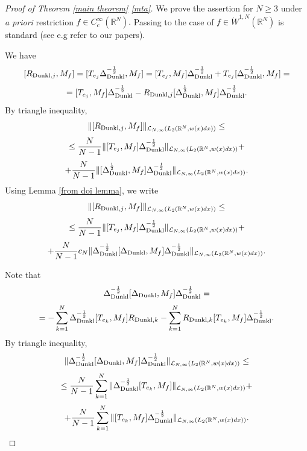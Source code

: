 \documentclass{amsart}
\begin{document}
\begin{proof}[Proof of Theorem \ref{main theorem} \eqref{mta}]
We prove the assertion for $N\geq3$ under {\it a priori} restriction $f\in C^{\infty}_c(\mathbb{R}^N).$ Passing to the case of $f\in\dot{W}^{1,N}(\mathbb{R}^N)$ is standard (see e.g {\color{red} refer to our papers}).

We have
$$[R_{{\rm Dunkl},j},M_f]=[T_{e_j}\Delta_{{\rm Dunkl}}^{-\frac12},M_f]=[T_{e_j},M_f]\Delta_{{\rm Dunkl}}^{-\frac12}+T_{e_j}[\Delta_{{\rm Dunkl}}^{-\frac12},M_f]=$$
$$=[T_{e_j},M_f]\Delta_{{\rm Dunkl}}^{-\frac12}-R_{{\rm Dunkl},j}[\Delta_{{\rm Dunkl}}^{\frac12},M_f]\Delta_{{\rm Dunkl}}^{-\frac12}.$$
By triangle inequality,
$$\|[R_{{\rm Dunkl},j},M_f]\|_{\mathcal{L}_{N,\infty}(L_2(\mathbb{R}^N,w(x)dx))}\leq$$
$$\leq\frac{N}{N-1}\|[T_{e_j},M_f]\Delta_{{\rm Dunkl}}^{-\frac12}\|_{\mathcal{L}_{N,\infty}(L_2(\mathbb{R}^N,w(x)dx))}+$$
$$+\frac{N}{N-1}\|[\Delta_{{\rm Dunkl}}^{\frac12},M_f]\Delta_{{\rm Dunkl}}^{-\frac12}\|_{\mathcal{L}_{N,\infty}(L_2(\mathbb{R}^N,w(x)dx))}.$$
Using Lemma \ref{from doi lemma}, we write
$$\|[R_{{\rm Dunkl},j},M_f]\|_{\mathcal{L}_{N,\infty}(L_2(\mathbb{R}^N,w(x)dx))}\leq$$
$$\leq\frac{N}{N-1}\|[T_{e_j},M_f]\Delta_{{\rm Dunkl}}^{-\frac12}\|_{\mathcal{L}_{N,\infty}(L_2(\mathbb{R}^N,w(x)dx))}+$$
$$+\frac{N}{N-1}c_N\|\Delta_{{\rm Dunkl}}^{-\frac12}[\Delta_{{\rm Dunkl}},M_f]\Delta_{{\rm Dunkl}}^{-\frac12}\|_{\mathcal{L}_{N,\infty}(L_2(\mathbb{R}^N,w(x)dx))}.$$

Note that
$$\Delta_{{\rm Dunkl}}^{-\frac12}[\Delta_{{\rm Dunkl}},M_f]\Delta_{{\rm Dunkl}}^{-\frac12}=$$
$$=-\sum_{k=1}^N\Delta_{{\rm Dunkl}}^{-\frac12}[T_{e_k},M_f]R_{{\rm Dunkl},k}-\sum_{k=1}^N R_{{\rm Dunkl},k}[T_{e_k},M_f]\Delta_{{\rm Dunkl}}^{-\frac12}.$$
By triangle inequality,
$$\|\Delta_{{\rm Dunkl}}^{-\frac12}[\Delta_{{\rm Dunkl}},M_f]\Delta_{{\rm Dunkl}}^{-\frac12}\|_{\mathcal{L}_{N,\infty}(L_2(\mathbb{R}^N,w(x)dx))}\leq$$
$$\leq\frac{N}{N-1}\sum_{k=1}^N\|\Delta_{{\rm Dunkl}}^{-\frac12}[T_{e_k},M_f]\|_{\mathcal{L}_{N,\infty}(L_2(\mathbb{R}^N,w(x)dx))}+$$
$$+\frac{N}{N-1}\sum_{k=1}^N\|[T_{e_k},M_f]\Delta_{{\rm Dunkl}}^{-\frac12}\|_{\mathcal{L}_{N,\infty}(L_2(\mathbb{R}^N,w(x)dx))}.$$


\end{proof}
\end{document}
